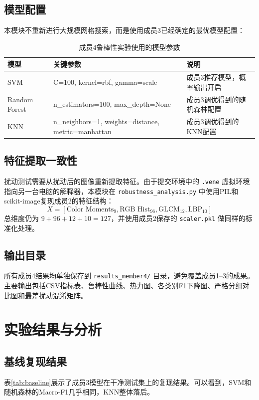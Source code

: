 \documentclass[12pt,a4paper]{ctexart}
\begin{document}
\subsection{模型配置}
本模块不重新进行大规模网格搜索，而是使用成员3已经确定的最优模型配置：
\begin{table}[H]
\centering
\caption{成员4鲁棒性实验使用的模型参数}
\label{tab:model_params}
\begin{tabular}{lll}
\toprule
\textbf{模型} & \textbf{关键参数} & \textbf{说明} \\
\midrule
SVM & C=100, kernel=rbf, gamma=scale & 成员3推荐模型，概率输出开启 \\
Random Forest & n\_estimators=100, max\_depth=None & 成员3调优得到的随机森林配置 \\
KNN & n\_neighbors=1, weights=distance, metric=manhattan & 成员3调优得到的KNN配置 \\
\bottomrule
\end{tabular}
\end{table}

\subsection{特征提取一致性}
扰动测试需要从扰动后的图像重新提取特征。由于提交环境中的 \texttt{.vene} 虚拟环境指向另一台电脑的解释器，本模块在 \texttt{robustness\_analysis.py} 中使用PIL和scikit-image复现成员2的特征结构：
\begin{equation}
    X = [\text{Color Moments}_{9}, \text{RGB Hist}_{96}, \text{GLCM}_{12}, \text{LBP}_{10}]
\end{equation}
总维度仍为 $9+96+12+10=127$，并使用成员2保存的 \texttt{scaler.pkl} 做同样的标准化处理。

\subsection{输出目录}
所有成员4结果均单独保存到 \texttt{results\_member4/} 目录，避免覆盖成员1--3的成果。主要输出包括CSV指标表、鲁棒性曲线、热力图、各类别F1下降图、严格分组对比图和最差扰动混淆矩阵。

\section{实验结果与分析}

\subsection{基线复现结果}
表\ref{tab:baseline}展示了成员3模型在干净测试集上的复现结果。可以看到，SVM和随机森林的Macro-F1几乎相同，KNN整体落后。
\end{document}
